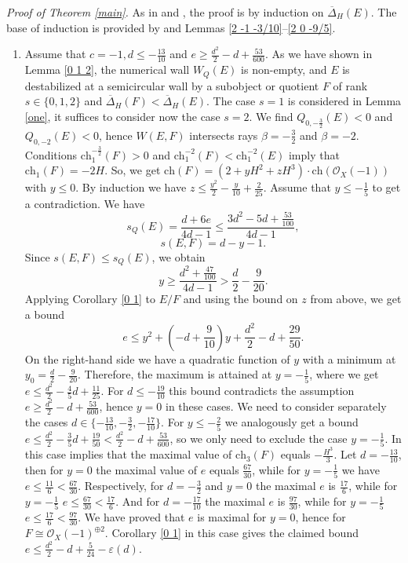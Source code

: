 \documentclass{amsart}
\begin{document}
	\textit{Proof of Theorem \ref{main}.} As in \cite{Sch18} and \cite{Fano}, the proof is by induction on $\overline{\Delta}_H(E)$. The base of induction is provided by \cite[Theorem 3.4]{Vass} and Lemmas \ref{2 -1 -3/10}--\ref{2 0 -9/5}.
	
	\begin{enumerate}
		\item Assume that $c=-1,d\le-\frac{13}{10}$ and $e\ge\frac{d^2}{2}-d+\frac{53}{600}$. As we have shown in Lemma \ref{0 1 2}, the numerical wall $W_Q(E)$ is non-empty, and $E$ is destabilized at a semicircular wall by a subobject or quotient $F$ of rank $s\in\{0,1,2\}$ and $\overline{\Delta}_H(F)<\overline{\Delta}_H(E)$. The case $s=1$ is considered in Lemma \ref{one}, it suffices to consider now the case $s=2$. We find $Q_{0,-\frac 32}(E)<0$ and $Q_{0,-2}(E)<0$, hence $W(E,F)$ intersects rays $\beta=-\frac 32$ and $\beta=-2$. Conditions $\mathrm{ch}_1^{-\frac 32}(F)>0$ and $\mathrm{ch}_1^{-2}(F)<\mathrm{ch}_1^{-2}(E)$ imply that $\mathrm{ch}_1(F)=-2H$. So, we get $\mathrm{ch}(F)=(2+yH^2+zH^3)\cdot\mathrm{ch}(\mathcal O_X(-1))$ with $y\le 0$. By induction we have $z\le\frac{y^2}{2}-\frac{y}{10}+\frac{2}{25}$. Assume that $y\le-\frac 15$ to get a contradiction. We have
		$$s_Q(E)=\frac{d+6e}{4d-1}\le\frac{3d^2-5d+\frac{53}{100}}{4d-1},$$
		$$s(E,F)=d-y-1.$$
		Since $s(E,F)\le s_Q(E)$, we obtain
		$$y\ge\frac{d^2+\frac{47}{100}}{4d-1}>\frac d2-\frac{9}{20}.$$
		Applying Corollary \ref{0 1} to $E/F$ and using the bound on $z$ from above, we get a bound
		$$e\le y^2+\left(-d+\frac{9}{10}\right)y+\frac{d^2}{2}-d+\frac{29}{50}.$$
		On the right-hand side we have a quadratic function of $y$ with a minimum at $y_0=\frac d2-\frac{9}{20}$. Therefore, the maximum is attained at $y=-\frac 15$, where we get $e\le\frac{d^2}{2}-\frac 45d+\frac{11}{25}$. For $d\le-\frac{19}{10}$ this bound contradicts the assumption $e\ge\frac{d^2}{2}-d+\frac{53}{600}$, hence $y=0$ in these cases. We need to consider separately the cases $d\in\{-\frac{13}{10},-\frac 32,-\frac{17}{10}\}$. For $y\le-\frac 25$ we analogously get a bound $e\le\frac{d^2}{2}-\frac 35d+\frac{19}{50}<\frac{d^2}{2}-d+\frac{53}{600}$, so we only need to exclude the case $y=-\frac 15$. In this case \cite[Lemma 3.7]{Vass} implies that the maximal value of $\mathrm{ch}_3(F)$ equals $-\frac{H^3}{3}$. Let $d=-\frac{13}{10}$, then for $y=0$ the maximal value of $e$ equals $\frac{67}{30}$, while for $y=-\frac 15$ we have $e\le\frac{11}{6}<\frac{67}{30}$. Respectively, for $d=-\frac 32$ and $y=0$ the maximal $e$ is $\frac{17}{6}$, while for $y=-\frac 15$ $e\le\frac{67}{30}<\frac{17}{6}$. And for $d=-\frac{17}{10}$ the maximal $e$ is $\frac{97}{30}$, while for $y=-\frac 15$ $e\le\frac{17}{6}<\frac{97}{30}$. We have proved that $e$ is maximal for $y=0$, hence for $F\cong\mathcal O_X(-1)^{\oplus 2}$. Corollary \ref{0 1} in this case gives the claimed bound $e\le\frac{d^2}{2}-d+\frac{5}{24}-\varepsilon(d)$.
		

\end{enumerate}
\end{document}

